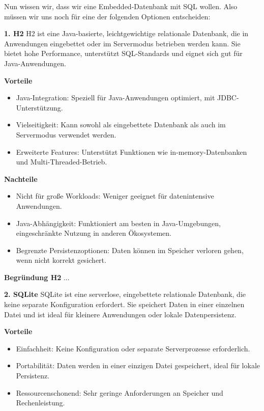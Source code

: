 \documentclass[a4paper,12pt]{report}
\begin{document}
    Nun wissen wir, dass wir eine Embedded-Datenbank mit SQL wollen.
    Also müssen wir uns noch für eine der folgenden Optionen entscheiden:

    \textbf{1. H2}
    H2 ist eine Java-basierte, leichtgewichtige relationale Datenbank,
    die in Anwendungen eingebettet oder im Servermodus betrieben werden kann.
    Sie bietet hohe Performance, unterstützt SQL-Standards und eignet sich gut für Java-Anwendungen.

    \textbf{Vorteile}
    \begin{itemize}
        \item Java-Integration: Speziell für Java-Anwendungen optimiert, mit JDBC-Unterstützung.
        \item Vielseitigkeit: Kann sowohl als eingebettete Datenbank als auch im Servermodus verwendet werden.
        \item Erweiterte Features: Unterstützt Funktionen wie in-memory-Datenbanken und Multi-Threaded-Betrieb.
    \end{itemize}

    \textbf{Nachteile}
    \begin{itemize}
        \item Nicht für große Workloads: Weniger geeignet für datenintensive Anwendungen.
        \item Java-Abhängigkeit: Funktioniert am besten in Java-Umgebungen, eingeschränkte Nutzung in anderen Ökosystemen.
        \item Begrenzte Persistenzoptionen: Daten können im Speicher verloren gehen, wenn nicht korrekt gesichert.
    \end{itemize}

    \textbf{Begründung H2} ... %

    \textbf{2. SQLite}
    SQLite ist eine serverlose, eingebettete relationale Datenbank, die keine separate Konfiguration erfordert.
    Sie speichert Daten in einer einzelnen Datei und ist ideal für kleinere Anwendungen oder lokale Datenpersistenz.

    \textbf{Vorteile}
    \begin{itemize}
        \item Einfachheit: Keine Konfiguration oder separate Serverprozesse erforderlich.
        \item Portabilität: Daten werden in einer einzigen Datei gespeichert, ideal für lokale Persistenz.
        \item Ressourcenschonend: Sehr geringe Anforderungen an Speicher und Rechenleistung.
    \end{itemize}
\end{document}
